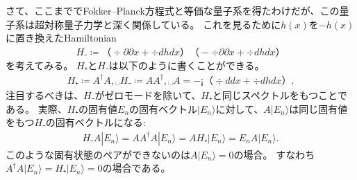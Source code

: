 \documentclass[12pt]{ltjsarticle}
\begin{document}
さて、ここまででFokker--Planck方程式と等価な量子系を得たわけだが、この量子系は超対称量子力学と深く関係している。
これを見るために$h(x)$を$-h(x)$に置き換えたHamiltonian
\begin{align}
    H₋ ≔  （÷{∂}{∂x}+÷{𝑑h}{𝑑x}）（-÷{∂}{∂x}+÷{𝑑h}{𝑑x}）
\end{align}
を考えてみる。
$H₊$と$H₋$は以下のように書くことができる。
\begin{align}
    H₊ ≔ A^†A,␣H₋ ≔ AA^†,␣
    A = -¡（÷{𝑑}{𝑑x}+÷{𝑑h}{𝑑x}）.
\end{align}
注目するべきは、$H₋$がゼロモードを除いて、$H₊$と同じスペクトルをもつことである。
実際、$H₊$の固有値$E_n$の固有ベクトル$|E_n⟩$に対して、$A|E_n⟩$は同じ固有値をもつ$H₋$の固有ベクトルになる:
\begin{align}
    H₋A|E_n⟩ = AA^†A|E_n⟩ = AH₊|E_n⟩ = E_nA|E_n⟩.
\end{align}
このような固有状態のペアができないのは$A|E_n⟩ = 0$の場合。
すなわち$A^†A|E_n⟩ = H₊|E_n⟩ = 0$の場合である。
\end{document}
